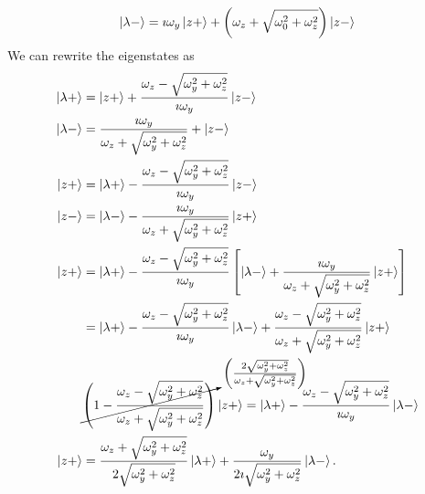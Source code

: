 \documentclass[a4paper,twoside]{article}
\begin{document}
\begin{itemize}
\begin{tcolorbox}[breakable]
\begin{equation}
\end{equation}
\begin{equation}
    \ket{\lambda-} = \imath\omega_y \ket{z+} + \left( \omega_z + \sqrt{\omega_0^2 + \omega_z^2}  \right) \ket{z-}
\end{equation}
We can rewrite the eigenstates as
\begin{align*}
    \ket{\lambda+}&=\ket{z+}+ \frac{\omega_z-\sqrt{\omega_y^2+\omega_z^2}}{\imath\omega_y}\ket{z-}\\
    \ket{\lambda-}&= \frac{\imath\omega_y}{\omega_z+\sqrt{\omega_y^2+\omega_z^2} } + \ket{z-}\\
        \ket{z+}&=\ket{\lambda+}- \frac{\omega_z-\sqrt{\omega_y^2+\omega_z^2}}{\imath\omega_y}\ket{z-}\\
        \ket{z-}&=\ket{\lambda-} - \frac{\imath\omega_y}{\omega_z+\sqrt{\omega_y^2+\omega_z^2}}\ket{z+}\\
        \ket{z+}&=\ket{\lambda+}- \frac{\omega_z-\sqrt{\omega_y^2+\omega_z^2}}{\imath{\omega_y}}\left[\ket{\lambda-}+ \frac{\imath\omega_y}{\omega_z + \sqrt{\omega_y^2+\omega_z^2}}\ket{z+}\right]\\
        &=\ket{\lambda+}- \frac{\omega_z-\sqrt{\omega_y^2+\omega_z^2}}{\imath\omega_y}\ket{\lambda-} + \frac{\omega_z-\sqrt{\omega_y^2+\omega_z^2}}{\omega_z+\sqrt{\omega_y^2+\omega_z^2}}\ket{z+}\\
        &\cancelto{\left( \frac{2\sqrt{\omega_y^2+\omega_z^2}}{\omega_z+\sqrt{\omega_y^2+\omega_z^2}}\right)}{\left(1- \frac{\omega_z-\sqrt{\omega_y^2+\omega_z^2}}{\omega_z + \sqrt{\omega_y^2+\omega_z^2}}\right)}\ket{z+} = \ket{\lambda+} - \frac{\omega_z-\sqrt{\omega_y^2+\omega_z^2}}{\imath\omega_y}\ket{\lambda-}\\
        \ket{z+}&= \frac{\omega_z+\sqrt{\omega_y^2+\omega_z^2}}{2\sqrt{\omega_y^2+\omega_z^2}}\ket{\lambda+} + \frac{\omega_y}{2\imath\sqrt{\omega_y^2+\omega_z^2} }\ket{\lambda-} 
.\end{align*}


\end{tcolorbox}
\end{itemize}
\end{document}

